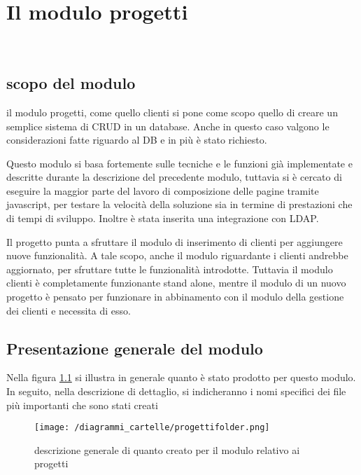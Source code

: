 
\chapter{Il modulo progetti}
\label{cap:modulo-progetti}

\\

\section{scopo del modulo} il modulo progetti, come quello clienti si pone come scopo quello di creare un semplice sistema di CRUD in un database. Anche in questo caso valgono le considerazioni fatte riguardo al DB e in più è stato richiesto.

Questo modulo si basa fortemente sulle tecniche e le funzioni già implementate e descritte durante la descrizione del precedente modulo, tuttavia si è cercato di eseguire la  maggior parte del lavoro di composizione delle pagine tramite javascript, per testare la velocità della soluzione sia in termine di prestazioni che di tempi di sviluppo. Inoltre è stata inserita una integrazione con LDAP.

Il progetto punta a sfruttare il modulo di inserimento di clienti per aggiungere nuove funzionalità.
A tale scopo, anche il modulo riguardante i clienti andrebbe aggiornato, per sfruttare tutte le funzionalità introdotte. Tuttavia il modulo clienti è completamente funzionante stand alone, mentre il modulo di un nuovo progetto è pensato per funzionare in abbinamento con il modulo della gestione dei clienti e necessita di esso.
\section{Presentazione generale del modulo}
Nella figura \ref{fig:cartelle-progetti} si illustra in generale quanto è stato prodotto per questo modulo. In seguito, nella descrizione di dettaglio, si indicheranno i nomi specifici dei file più importanti che sono stati creati
\begin{figure}[!ht]
\centering
\texttt{[image: /diagrammi\_cartelle/progettifolder.png]}
\caption{descrizione generale di quanto creato per il modulo relativo ai progetti\label{fig:cartelle-progetti}}
\end{figure}
